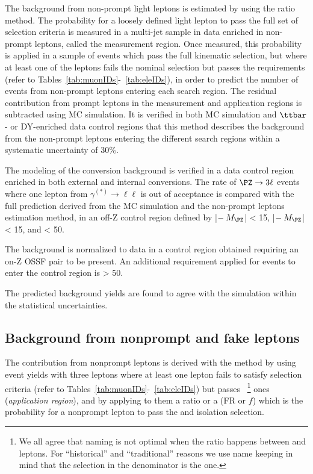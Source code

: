 The background from non-prompt light leptons is estimated by using the \ttol ratio method. 
The probability for a loosely defined light lepton to pass the full set of selection criteria is measured in a multi-jet sample in data enriched in non-prompt leptons, called the measurement region. 
Once measured, this probability is applied in a sample of events which
pass the full kinematic selection, but where at least one of the
leptons fails the nominal selection but passes the \lo requirements
(refer to Tables~\ref{tab:muonIDs}-~\ref{tab:eleIDs}), 
in order to predict the number of events from non-prompt leptons entering each search region. 
The residual contribution from prompt leptons in the measurement and application regions is subtracted using MC simulation. 
It is verified in both MC simulation and $\ttbar$- or DY-enriched data control regions that this method describes the background from the non-prompt leptons entering the different search regions within 
a systematic uncertainty of 30\%. 
 
The modeling of the conversion background is verified in a data control region enriched in both external and internal conversions. 
The rate of $\PZ \to 3\ell$ events where one lepton from $\gamma^{(*)}\to\ell\ell$ is out of acceptance is compared with 
the full prediction derived from the MC simulation and the non-prompt leptons estimation method, in an off-Z control region 
defined by |\Mll $- \:M_\PZ$| < 15\GeV, |\mlll $- \:M_\PZ$| < 15\GeV,
and \ptmiss < 50\GeV. 

The \WZ background is normalized to data in a control region obtained 
requiring an on-Z OSSF pair to be present. An additional requirement applied 
for events to enter the control region is \ptmiss > 50\GeV.

The predicted background yields are found to agree with the simulation
within the statistical uncertainties. 


\subsection{Background from nonprompt and fake leptons}\label{sec:tight_loose_method}

The contribution from nonprompt leptons is derived with the \ttol method
by using event yields with three leptons where at least one lepton fails to satisfy \ti 
selection criteria (refer to
Tables~\ref{tab:muonIDs}-~\ref{tab:eleIDs}) but passes
\fo~\footnote{We all agree that \ttol naming is not optimal when the
  ratio happens between \ti and \fo leptons. For ``historical'' and ``traditional''
  reasons we use \ttol name keeping in mind that the selection in the
  denominator is the \fo one.}
ones (\emph{application region}), 
and by applying to them a \ttol ratio or a \fr (FR
or $f$) which is the probability for 
a nonprompt lepton to pass the \ti and isolation selection.

